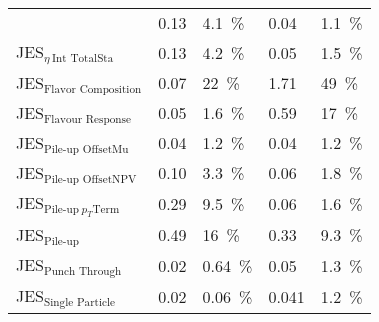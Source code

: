 \begin{center}
\begin{tabular}{>{}m{5.0cm}>{}m{2.5cm}>{}m{2.0cm} >{}m{2.5cm}>{}m{1.0cm}}
{{JES$_{\eta ~\text{Int NonClosure}}$ & 0.13 & 4.1~\% & 0.04 &  1.1~\% \\

JES$_{\eta ~\text{Int TotalSta}}$ & 0.13 &  4.2~\% & 0.05 &  1.5~\% \\

JES$_{\text{Flavor Composition}}$ & 0.07 &  22~\% & 1.71 & 49~\%  \\


JES$_{\text{Flavour Response} }$& 0.05&  1.6~\% & 0.59 &  17~\% \\


JES$_{\text{Pile-up OffsetMu}}$ & 0.04 &  1.2~\% & 0.04 &  1.2~\%\\

JES$_{\text{Pile-up OffsetNPV}} $& 0.10 &  3.3~\% & 0.06 &  1.8~\%\\


JES$_{ \text{Pile-up}~p_T \text{Term}}$ & 0.29&  9.5~\% & 0.06 &  1.6~\%\\

JES$_{\text{Pile-up}}$& 0.49 &  16~\% & 0.33 &  9.3~\%\\


JES$_{\text{Punch Through}} $& 0.02 &  0.64~\% & 0.05 &  1.3~\%\\

JES$_{\text{Single Particle}} $ & 0.02 &  0.06~\%  &0.041 &  1.2~\%\\
	\bottomrule
	\end{tabular}
	
\end{center}




